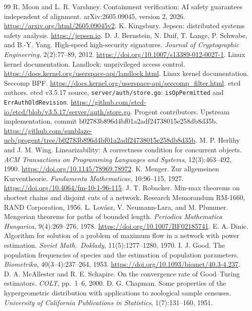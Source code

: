 \begin{thebibliography}{99}
 R. Moon and L. R. Varshney. Containment verification: AI safety guarantees independent of alignment. arXiv:2605.09045, version 2, 2026. \url{https://arxiv.org/html/2605.09045v2}.
 K. Kingsbury. Jepsen: distributed systems safety analysis. \url{https://jepsen.io}.
 D. J. Bernstein, N. Duif, T. Lange, P. Schwabe, and B.-Y. Yang. High-speed high-security signatures. \emph{Journal of Cryptographic Engineering}, 2(2):77--89, 2012. \url{https://doi.org/10.1007/s13389-012-0027-1}.
 Linux kernel documentation. Landlock: unprivileged access control. \url{https://docs.kernel.org/userspace-api/landlock.html}.
 Linux kernel documentation. Seccomp BPF. \url{https://docs.kernel.org/userspace-api/seccomp_filter.html}.
 etcd authors. etcd v3.5.17 source, \texttt{server/auth/store.go}: \texttt{isOpPermitted} and \texttt{ErrAuthOldRevision}. \url{https://github.com/etcd-io/etcd/blob/v3.5.17/server/auth/store.go}.
 Progent contributors. Upstream implementation, commit b02783b896d4bf01a2adf24738015e258db8d35b. \url{https://github.com/sunblaze-ucb/progent/tree/b02783b896d4bf01a2adf24738015e258db8d35b}.
 M. P. Herlihy and J. M. Wing. Linearizability: A correctness condition for concurrent objects. \emph{ACM Transactions on Programming Languages and Systems}, 12(3):463--492, 1990. \url{https://doi.org/10.1145/78969.78972}.
 K. Menger. Zur allgemeinen Kurventheorie. \emph{Fundamenta Mathematicae}, 10:96--115, 1927. \url{https://doi.org/10.4064/fm-10-1-96-115}.
 J. T. Robacker. Min-max theorems on shortest chains and disjoint cuts of a network. Research Memorandum RM-1660, RAND Corporation, 1956.
 L. Lov\'asz, V. Neumann-Lara, and M. Plummer. Mengerian theorems for paths of bounded length. \emph{Periodica Mathematica Hungarica}, 9(4):269--276, 1978. \url{https://doi.org/10.1007/BF02185741}.
 E. A. Dinic. Algorithm for solution of a problem of maximum flow in a network with power estimation. \emph{Soviet Math.\ Doklady}, 11(5):1277--1280, 1970.
 I. J. Good. The population frequencies of species and the estimation of population parameters. \emph{Biometrika}, 40(3--4):237--264, 1953. \url{https://doi.org/10.1093/biomet/40.3-4.237}.
 D. A. McAllester and R. E. Schapire. On the convergence rate of Good--Turing estimators. \emph{COLT}, pp.~1--6, 2000.
 D. G. Chapman. Some properties of the hypergeometric distribution with applications to zoological sample censuses. \emph{University of California Publications in Statistics}, 1(7):131--160, 1951.

\end{thebibliography}
